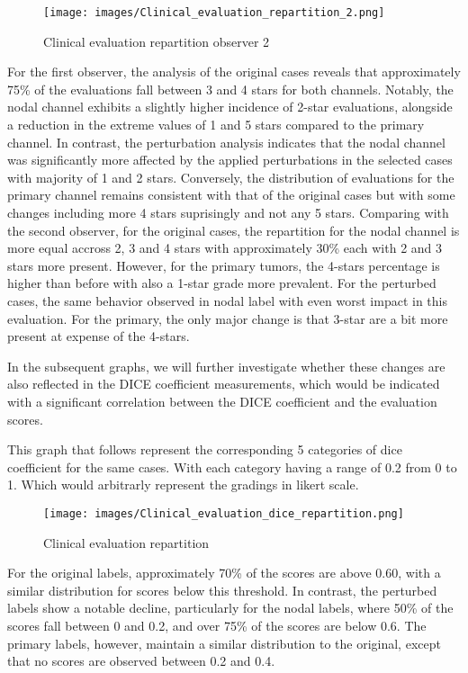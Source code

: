 \begin{figure}[ht]
    \centering
    \texttt{[image: images/Clinical\_evaluation\_repartition\_2.png]}
    \caption{Clinical evaluation repartition observer 2}
    \label{fig:three_subfigures}
\end{figure}

\newpage

For the first observer, the analysis of the original cases reveals that approximately 75\% of the evaluations fall between 3 and 4 stars for both channels. Notably, the nodal channel exhibits a slightly higher incidence of 2-star evaluations, alongside a reduction in the extreme values of 1 and 5 stars compared to the primary channel.
In contrast, the perturbation analysis indicates that the nodal channel was significantly more affected by the applied perturbations in the selected cases with majority of 1 and 2 stars. Conversely, the distribution of evaluations for the primary channel remains consistent with that of the original cases but with some changes including more 4 stars suprisingly and not any 5 stars.
Comparing with the second observer, for the original cases, the repartition for the nodal channel is more equal accross 2, 3 and 4 stars with approximately 30\% each with 2 and 3 stars more present.
However, for the primary tumors, the 4-stars percentage is higher than before with also a 1-star grade more prevalent. 
For the perturbed cases, the same behavior observed in nodal label with even worst impact in this evaluation. For the primary, the only major change is that 3-star are a bit more present at expense of the 4-stars.

In the subsequent graphs, we will further investigate whether these changes are also reflected in the DICE coefficient measurements, which would be indicated with a significant correlation between the DICE coefficient and the evaluation scores.

This graph that follows represent the corresponding 5 categories of dice coefficient for the same cases. With each category having a range of 0.2 from 0 to 1.
Which would arbitrarly represent the gradings in likert scale.
\begin{figure}[ht]
    \centering
    \texttt{[image: images/Clinical\_evaluation\_dice\_repartition.png]}
    \caption{Clinical evaluation repartition}
    \label{fig:three_subfigures}
\end{figure}

For the original labels, approximately 70\% of the scores are above 0.60, with a similar distribution for scores below this threshold. In contrast, the perturbed labels show a notable decline, particularly for the nodal labels, where 50\% of the scores fall between 0 and 0.2, and over 75\% of the scores are below 0.6. The primary labels, however, maintain a similar distribution to the original, except that no scores are observed between 0.2 and 0.4.

